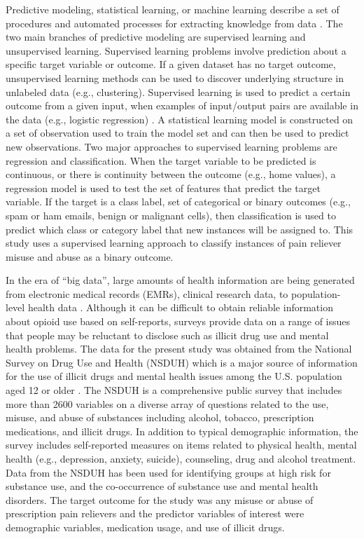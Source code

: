 \documentclass[sigconf]{acmart}
\begin{document}
Predictive modeling, statistical learning, or machine learning describe a 
set of procedures and automated processes for extracting knowledge from data 
\cite{james13, kuhn13, muller17, raschka17}. The two main branches of 
predictive modeling are supervised learning and unsupervised learning. 
Supervised learning problems involve prediction about a specific target 
variable or outcome. If a given dataset has no target outcome, unsupervised 
learning methods can be used to discover underlying structure in unlabeled data 
(e.g., clustering). Supervised learning is used to predict a certain outcome 
from a given input, when examples of input/output pairs are available in the 
data (e.g., logistic regression) \cite{muller17}. A statistical learning model 
is constructed on a set of observation used to train the model set and can then 
be used to predict new observations. Two major approaches to supervised learning 
problems are regression and classification. When the target variable to be 
predicted is continuous, or there is continuity between the outcome 
(e.g., home values), a regression model is used to test the set of features 
that predict the target variable. If the target is a class label, set of 
categorical or binary outcomes (e.g., spam or ham emails, benign or malignant 
cells), then classification is used to predict which class or category label 
that new instances will be assigned to. This study uses a supervised 
learning approach to classify instances of pain reliever misuse and abuse
as a binary outcome. 


In the era of ``big data'', large amounts of health information are being 
generated from electronic medical records (EMRs), clinical research data, to 
population-level health data \cite{herland14}. Although it can be difficult 
to obtain reliable information about opioid use based on self-reports, surveys 
provide data on a range of issues that people may be reluctant to disclose 
such as illicit drug use and mental health problems. The data for the present 
study was obtained from the National Survey on Drug Use and Health (NSDUH) 
which is a major source of information for the use of illicit drugs and mental 
health issues among the U.S. population aged 12 or older \cite{samhsa18}. 
The NSDUH is a comprehensive public survey that includes more than 2600 
variables on a diverse array of questions related to the use, misuse, and 
abuse of substances including alcohol, tobacco, prescription medications, and 
illicit drugs. In addition to typical demographic information, the survey
includes self-reported measures on items related to physical health, mental 
health (e.g., depression, anxiety, suicide), counseling, drug and alcohol 
treatment. Data from the NSDUH has been used for identifying groups at high 
risk for substance use, and the co-occurrence of substance use and mental 
health disorders. The target outcome for the study was any misuse or abuse 
of prescription pain relievers and the predictor variables of interest were 
demographic variables, medication usage, and use of illicit drugs. 
\end{document}
